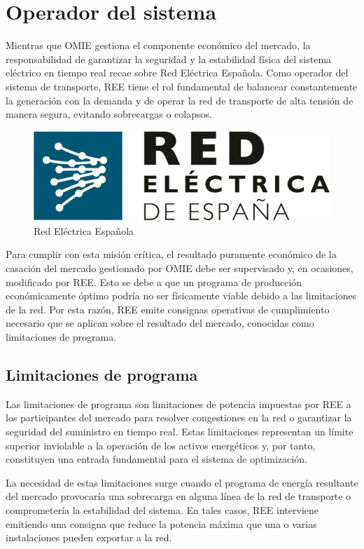 \section{Operador del sistema}
\label{makereference4.2}

Mientras que OMIE gestiona el componente económico del mercado, la responsabilidad de garantizar la seguridad y la estabilidad física del sistema eléctrico en tiempo real recae sobre Red Eléctrica Española. Como operador del sistema de transporte, REE tiene el rol fundamental de balancear constantemente la generación con la demanda y de operar la red de transporte de alta tensión de manera segura, evitando sobrecargas o colapsos.

\begin{figure}
  \centering
  \includegraphics[width=0.5\linewidth]{figures/ree.jpg}
  \caption{Red Eléctrica Española}
  \label{fig:ree}
\end{figure}

Para cumplir con esta misión crítica, el resultado puramente económico de la casación del mercado gestionado por OMIE debe ser supervisado y, en ocasiones, modificado por REE. Esto se debe a que un programa de producción económicamente óptimo podría no ser físicamente viable debido a las limitaciones de la red. Por esta razón, REE emite consignas operativas de cumplimiento necesario que se aplican sobre el resultado del mercado, conocidas como limitaciones de programa.

\subsection{Limitaciones de programa}
\label{makereference4.2.1}

Las limitaciones de programa son limitaciones de potencia impuestas por REE a los participantes del mercado para resolver congestiones en la red o garantizar la seguridad del suministro en tiempo real. Estas limitaciones representan un límite superior inviolable a la operación de los activos energéticos y, por tanto, constituyen una entrada fundamental para el sistema de optimización.

La necesidad de estas limitaciones surge cuando el programa de energía resultante del mercado provocaría una sobrecarga en alguna línea de la red de transporte o comprometería la estabilidad del sistema. En tales casos, REE interviene emitiendo una consigna que reduce la potencia máxima que una o varias instalaciones pueden exportar a la red.


